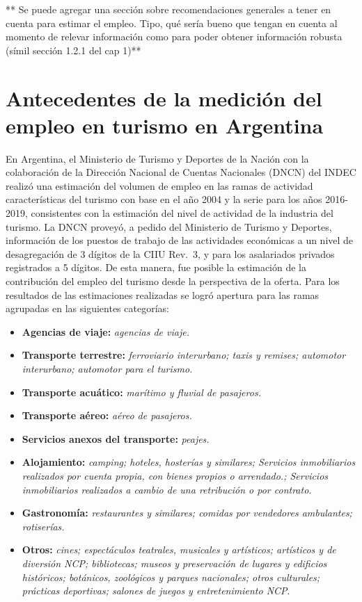 \documentclass[
  openany]{book}
\providecommand{\tightlist}{%
  \setlength{\itemsep}{0pt}\setlength{\parskip}{0pt}}
\begin{document}
** Se puede agregar una sección sobre recomendaciones generales a tener en cuenta para estimar el empleo. Tipo, qué sería bueno que tengan en cuenta al momento de relevar información como para poder obtener información robusta (símil sección 1.2.1 del cap 1)**

\hypertarget{antecedentes-de-la-mediciuxf3n-del-empleo-en-turismo-en-argentina}{%
\section{Antecedentes de la medición del empleo en turismo en Argentina}\label{antecedentes-de-la-mediciuxf3n-del-empleo-en-turismo-en-argentina}}

En Argentina, el Ministerio de Turismo y Deportes de la Nación con la colaboración de la Dirección Nacional de Cuentas Nacionales (DNCN) del INDEC realizó una estimación del volumen de empleo en las ramas de actividad características del turismo con base en el año 2004 y la serie para los años 2016-2019, consistentes con la estimación del nivel de actividad de la industria del turismo.
La DNCN proveyó, a pedido del Ministerio de Turismo y Deportes, información de los puestos de trabajo de las actividades económicas a un nivel de desagregación de 3 dígitos de la CIIU Rev.~3, y para los asalariados privados registrados a 5 dígitos. De esta manera, fue posible la estimación de la contribución del empleo del turismo desde la perspectiva de la oferta.
Para los resultados de las estimaciones realizadas se logró apertura para las ramas agrupadas en las siguientes categorías:

\begin{itemize}
\tightlist
\item
  \textbf{Agencias de viaje:} \emph{agencias de viaje.}
\item
  \textbf{Transporte terrestre:} \emph{ferroviario interurbano; taxis y remises; automotor interurbano; automotor para el turismo.}
\item
  \textbf{Transporte acuático:} \emph{marítimo y fluvial de pasajeros.}
\item
  \textbf{Transporte aéreo:} \emph{aéreo de pasajeros.}
\item
  \textbf{Servicios anexos del transporte:} \emph{peajes.}
\item
  \textbf{Alojamiento:} \emph{camping; hoteles, hosterías y similares; Servicios inmobiliarios realizados por cuenta propia, con bienes propios o arrendado.; Servicios inmobiliarios realizados a cambio de una retribución o por contrato.}
\item
  \textbf{Gastronomía:} \emph{restaurantes y similares; comidas por vendedores ambulantes; rotiserías.}
\item
  \textbf{Otros:} \emph{cines; espectáculos teatrales, musicales y artísticos; artísticos y de diversión NCP; bibliotecas; museos y preservación de lugares y edificios históricos; botánicos, zoológicos y parques nacionales; otros culturales; prácticas deportivas; salones de juegos y entretenimiento NCP}.
\end{itemize}
\end{document}
